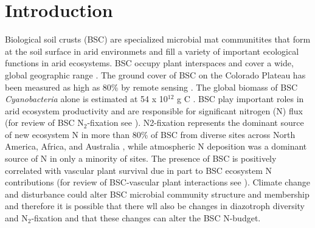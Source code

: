 \section{Introduction}
Biological soil crusts (BSC) are specialized microbial mat communitites that form at the soil surface in arid environmets and fill a variety of important ecological functions in arid ecosystems. BSC occupy plant interspaces and cover a
wide, global geographic range \citep{garcia2003estimates}. The ground cover of
BSC on the Colorado Plateau has been measured as high as 80\% by remote sensing
\citep{karnieli2001}. The global biomass of BSC \textit{Cyanobacteria} alone is
estimated at 54 x 10$^{12}$ g C \citep{garcia2003estimates}. BSC play important
roles in arid ecosystem productivity and are responsible for significant
nitrogen (N) flux (for review of BSC N$_{2}$-fixation see \citet{belnap2003}).
N2-fixation represents the dominant source of new ecosystem N in more than 80\%
of BSC from diverse sites across North America, Africa, and Australia 
\citep{Evans_1999}, while atmospheric N deposition was a dominant source of N
in only a minority of sites. The presence of BSC is positively correlated with
vascular plant survival due in part to BSC ecosystem N contributions (for
review of BSC-vascular plant interactions see \citet{BelnapVascular}). Climate
change and disturbance could alter BSC microbial community structure and membership
and therefore it is possible that there wll also be changes in diazotroph diversity
and N$_{2}$-fixation and that these changes can alter the BSC N-budget.

